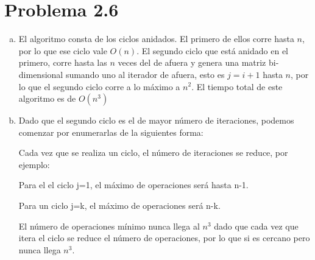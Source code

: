 \documentclass{article}
\begin{document}
\section*{Problema 2.6}

\begin{enumerate}[(a)]
    
\item El algoritmo consta de los ciclos anidados. El primero de ellos corre
hasta $n$, por lo que ese ciclo vale $O(n)$. El segundo ciclo que está anidado
en el primero, corre hasta las $n$ veces del de afuera y genera una matriz
bi-dimensional sumando uno al iterador de afuera, esto es $j= i + 1$ hasta $n$,
por lo que el segundo ciclo corre a lo máximo a $n^2$. El tiempo total de este
algoritmo es de $O(n^3)$

\item Dado que el segundo ciclo es el de mayor número de iteraciones, podemos
comenzar por enumerarlas de la siguientes forma:

Cada vez que se realiza un ciclo, el número de iteraciones se reduce, por
ejemplo:

Para el el ciclo j=1, el máximo de operaciones será hasta n-1.

Para un ciclo j=k, el máximo de operaciones será n-k.

El número de operaciones mínimo nunca llega al $n^3$ dado que cada vez que itera
el ciclo se reduce el número de operaciones, por lo que si es cercano pero nunca
llega $n^3$.

\end{enumerate}
\end{document}
